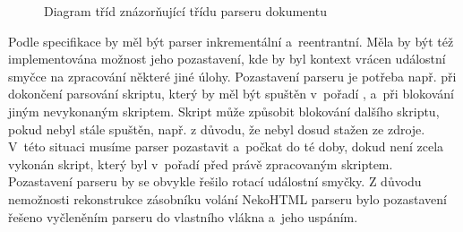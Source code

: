 \begin{figure}[H]
  \begin{center}
    \caption{Diagram tříd znázorňující třídu parseru dokumentu}
    \label{Figure.DocumentParser}
  \end{center}
\end{figure}

Podle specifikace by měl být parser inkrementální a~reentrantní. Měla by být též implementována možnost jeho pozastavení, kde by byl kontext vrácen událostní smyčce na zpracování některé jiné úlohy. Pozastavení parseru je potřeba např. při dokončení parsování skriptu, který by měl být spuštěn v~pořadí , a~při blokování jiným nevykonaným skriptem. Skript může způsobit blokování dalšího skriptu, pokud nebyl stále spuštěn, např. z důvodu, že nebyl dosud stažen ze zdroje. V~této situaci musíme parser pozastavit a~počkat do té doby, dokud není zcela vykonán skript, který byl v~pořadí před právě zpracovaným skriptem. Pozastavení parseru by se obvykle řešilo rotací událostní smyčky. Z důvodu nemožnosti rekonstrukce zásobníku volání NekoHTML parseru bylo pozastavení řešeno vyčleněním parseru do vlastního vlákna a~jeho uspáním.


